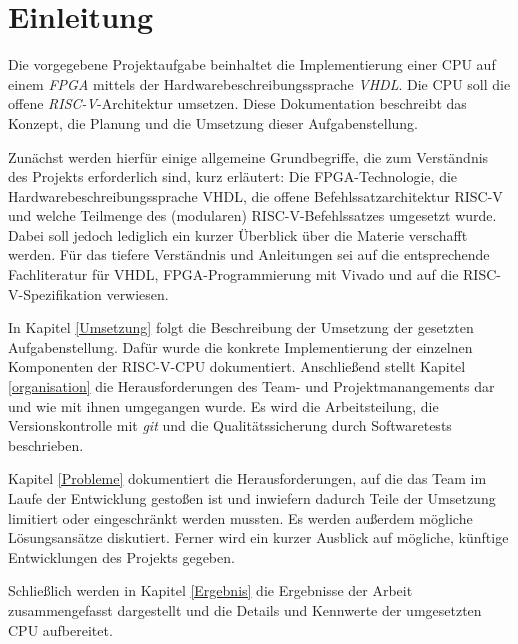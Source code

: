 \chapter{Einleitung} %
\label{Einleitung} %


\newcommand{\keyword}[1]{\textbf{#1}}
\newcommand{\tabhead}[1]{\textbf{#1}}
\newcommand{\code}[1]{\texttt{#1}}
\newcommand{\file}[1]{\texttt{\bfseries#1}}
\newcommand{\option}[1]{\itshape#1}

Die vorgegebene Projektaufgabe beinhaltet die Implementierung einer CPU auf einem \emph{FPGA} mittels der Hardwarebeschreibungssprache \emph{VHDL}. Die CPU soll die offene \emph{RISC-V}-Architektur umsetzen. Diese Dokumentation beschreibt das Konzept, die Planung und die Umsetzung dieser Aufgabenstellung.

Zunächst werden hierfür einige allgemeine Grundbegriffe, die zum Verständnis des Projekts erforderlich sind, kurz erläutert: Die FPGA-Technologie, die Hardwarebeschreibungssprache VHDL, die offene Befehlssatzarchitektur RISC-V und welche Teilmenge des (modularen) RISC-V-Befehlssatzes umgesetzt wurde. Dabei soll jedoch lediglich ein kurzer Überblick über die Materie verschafft werden. Für das tiefere Verständnis und Anleitungen sei auf die entsprechende Fachliteratur für VHDL\citep{Ashenden:609207}, FPGA-Programmierung\cite{Chu} mit Vivado\cite{churiwala} und auf die RISC-V-Spezifikation\citep{RISC} verwiesen.

In Kapitel \ref{Umsetzung} folgt die Beschreibung der Umsetzung der
gesetzten Aufgabenstellung. Dafür wurde die konkrete Implementierung der
einzelnen Komponenten der RISC-V-CPU dokumentiert. Anschließend stellt Kapitel \ref{organisation} die Herausforderungen des Team- und Projektmanangements dar und wie mit ihnen umgegangen wurde. Es wird die Arbeitsteilung, die Versionskontrolle mit \emph{git} und die Qualitätssicherung durch Softwaretests beschrieben.

Kapitel \ref{Probleme} dokumentiert die Herausforderungen, auf die das
Team im Laufe der Entwicklung gestoßen ist und inwiefern dadurch Teile
der Umsetzung limitiert oder eingeschränkt werden mussten. Es werden
außerdem mögliche Lösungsansätze diskutiert. Ferner wird ein kurzer
Ausblick auf mögliche, künftige Entwicklungen des Projekts gegeben.

Schließlich werden in Kapitel \ref{Ergebnis} die Ergebnisse der Arbeit zusammengefasst dargestellt und die Details und Kennwerte der umgesetzten CPU aufbereitet. 
